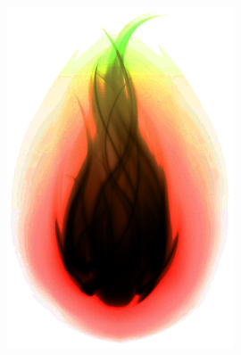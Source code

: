 \documentclass[12pt]{report}
\begin{document}
\cleardoublepage

\thispagestyle{empty}

\vspace*{\fill}

\begin{figure}[h]
    \centering
    \includegraphics[width=0.6\textwidth]{fireball}
\end{figure}

\vfill
\end{document}
